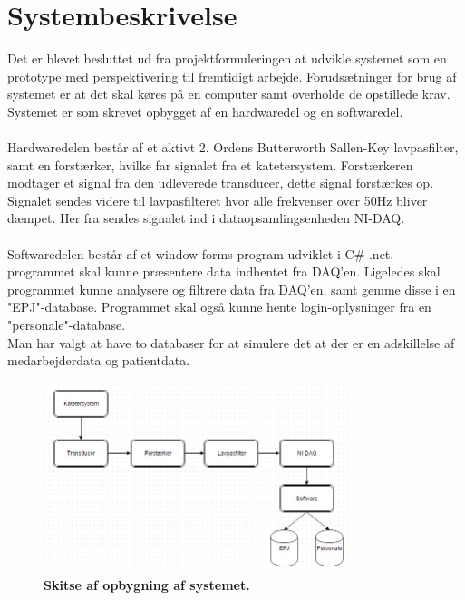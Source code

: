 \chapter{Systembeskrivelse}
Det er blevet besluttet ud fra projektformuleringen at udvikle systemet som en prototype med perspektivering til fremtidigt arbejde. Forudsætninger for brug af systemet er at det skal køres på en computer samt overholde de opstillede krav. Systemet er som skrevet opbygget af en hardwaredel og en softwaredel. \\\\
Hardwaredelen består af et aktivt 2. Ordens Butterworth Sallen-Key lavpasfilter, samt en forstærker, hvilke far signalet fra et katetersystem. Forstærkeren modtager et signal fra den udleverede transducer, dette signal forstærkes op. Signalet sendes videre til lavpasfilteret hvor alle frekvenser over 50Hz bliver dæmpet. Her fra sendes signalet ind i dataopsamlingsenheden NI-DAQ.\\\\
Softwaredelen består af et window forms program udviklet i C\# .net, programmet skal kunne præsentere data indhentet fra DAQ’en. Ligeledes skal programmet kunne analysere og filtrere data fra DAQ’en, samt gemme disse i en "EPJ"-database. Programmet skal også kunne hente login-oplysninger fra en "personale"-database. \\
Man har valgt at have to databaser for at simulere det at der er en adskillelse af medarbejderdata og patientdata.
\begin{figure}[H]
\includegraphics[width =0.8\textwidth , center]{billeder/system}
\caption{\textbf{Skitse af opbygning af systemet.}}
\end{figure}


